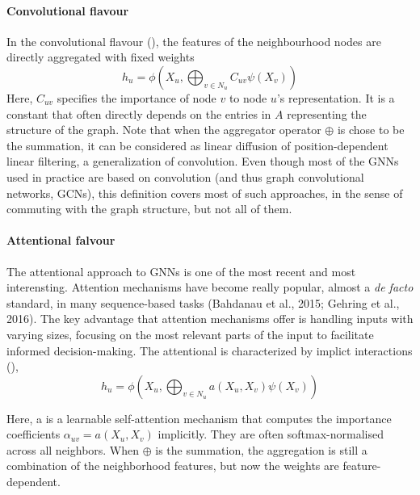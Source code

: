 \documentclass[binding=0.6cm]{sapthesis}
\begin{document}
\paragraph{Convolutional flavour}
\label{sec:bg.gnn.gcn}
In the convolutional flavour (\cite{kipf2016-semisupervised,defferrard2017-convolutional,wu2019-simplifying}), the features of the neighbourhood nodes are directly aggregated with fixed weights
\begin{equation}
    h_u = \phi \left( X_u, \bigoplus_{v \in N_u} C_{uv} \psi(X_v) \right)
\end{equation}
Here, $C_{uv}$ specifies the importance of node $v$ to node $u$’s representation. It is a constant that often directly depends on the entries in $A$ representing the structure of the graph. Note that when the aggregator operator $\oplus$ is chose to be the summation, it can be considered as linear diffusion of position-dependent linear filtering, a generalization of convolution. Even though most of the GNNs used in practice are based on convolution (and thus graph convolutional networks, GCNs), this definition covers most of such approaches, in the sense of commuting with the graph structure, but not all of them.

\paragraph{Attentional falvour}
\label{sec:bg.gnn.gat}
The attentional approach to GNNs is one of the most recent and most interensting. Attention mechanisms have become really popular, almost a \textit{de facto} standard, in many sequence-based tasks (Bahdanau et al., 2015; Gehring et al., 2016). The key advantage that attention mechanisms offer is handling inputs with varying sizes, focusing on the most relevant parts of the input to facilitate informed decision-making.
The attentional  is characterized by implict interactions (\cite{veličković2018gat,monti2016-geometric-mixture,zhang2018-gaan}),
\begin{equation}
    h_u = \phi \left( X_u, \bigoplus_{v \in N_u} a(X_u,X_v) \psi(X_v) \right)
\end{equation}

Here, a is a learnable self-attention mechanism that computes the importance coefficients $\alpha_{uv} = a(X_u, X_v)$ implicitly. They are often softmax-normalised across all neighbors. When $\oplus$ is the summation, the aggregation is still a combination of the neighborhood features, but now the weights are feature-dependent.
\end{document}
